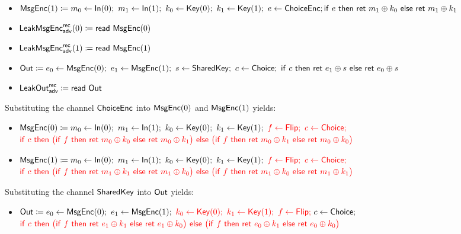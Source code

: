 \begin{itemize}
\item $\MsgEnc(1) \coloneqq m_0 \leftarrow \In(0); \ m_1 \leftarrow \In(1); \ k_0 \leftarrow \Key(0); \ k_1 \leftarrow \Key(1); \ e \leftarrow \ChoiceEnc; \\ \ifte{e}{\ret{m_1 \oplus k_0}}{\ret{m_1 \oplus k_1}}$
\item {\color{blue} $\LeakMsgEnc^\rec_\adv(0) \coloneqq \read{\MsgEnc(0)}$}
\item {\color{blue} $\LeakMsgEnc^\rec_\adv(1) \coloneqq \read{\MsgEnc(1)}$}
\item $\Out \coloneqq e_0 \leftarrow \MsgEnc(0); \ e_1 \leftarrow \MsgEnc(1); \ s \leftarrow \SharedKey; \ c \leftarrow \Choice; \  \ifte{c}{\ret{e_1 \oplus s}}{\ret{e_0 \oplus s}}$
\item {\color{blue} $\LeakOut^\rec_\adv \coloneqq \read{\Out}$}
\end{itemize}

\noindent Substituting the channel $\ChoiceEnc$ into $\MsgEnc(0)$ and $\MsgEnc(1)$ yields:

\begin{itemize}
\item $\MsgEnc(0) \coloneqq m_0 \leftarrow \In(0); \ m_1 \leftarrow \In(1); \ k_0 \leftarrow \Key(0); \ k_1 \leftarrow \Key(1); \ {\color{red} f \leftarrow \Flip; \ c \leftarrow \Choice;}$ \\ ${\color{red} \ifte{c}{\big(\ifte{f}{\ret{m_0 \oplus k_0}}{\ret{m_0 \oplus k_1}}\big)}{\big(\ifte{f}{\ret{m_0 \oplus k_1}}{\ret{m_0 \oplus k_0}}\big)}}$
\item $\MsgEnc(1) \coloneqq m_0 \leftarrow \In(0); \ m_1 \leftarrow \In(1); \ k_0 \leftarrow \Key(0); \ k_1 \leftarrow \Key(1); \ {\color{red} f \leftarrow \Flip; \ c \leftarrow \Choice;}$ \\ ${\color{red} \ifte{c}{\big(\ifte{f}{\ret{m_1 \oplus k_1}}{\ret{m_1 \oplus k_0}}\big)}{\big(\ifte{f}{\ret{m_1 \oplus k_0}}{\ret{m_1 \oplus k_1}}\big)}}$
\end{itemize}

\noindent Substituting the channel $\SharedKey$ into $\Out$ yields:

\begin{itemize}
\item $\Out \coloneqq e_0 \leftarrow \MsgEnc(0); \ e_1 \leftarrow \MsgEnc(1); \ {\color{red} k_0 \leftarrow \Key(0); \ k_1 \leftarrow \Key(1); \ f \leftarrow \Flip;} \ c \leftarrow \Choice; $ \\ ${\color{red} \ifte{c}{\big(\ifte{f}{\ret{e_1 \oplus k_1}}{\ret{e_1 \oplus k_0}}\big)}{\big(\ifte{f}{\ret{e_0 \oplus k_1}}{\ret{e_0 \oplus k_0}}\big)}}$
\end{itemize}


